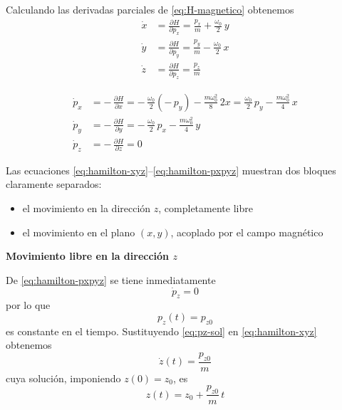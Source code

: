 \documentclass{article}
\begin{document}
Calculando las derivadas parciales de \eqref{eq:H-magnetico} obtenemos
\begin{equation}
\begin{split}
\dot{x}
&= \frac{\partial H}{\partial p_{x}}
 = \frac{p_{x}}{m} + \frac{\omega_{0}}{2}\,y \\[6pt]
\dot{y}
&= \frac{\partial H}{\partial p_{y}}
 = \frac{p_{y}}{m} - \frac{\omega_{0}}{2}\,x \\[6pt]
\dot{z}
&= \frac{\partial H}{\partial p_{z}}
 = \frac{p_{z}}{m}
\end{split}
\label{eq:hamilton-xyz}
\end{equation}

\begin{equation}
\begin{split}
\dot{p}_{x}
&= -\,\frac{\partial H}{\partial x}
 = -\,\frac{\omega_{0}}{2}\left(-\,p_{y}\right)
   - \frac{m\omega_{0}^{2}}{8}\,2x
 = \frac{\omega_{0}}{2}\,p_{y}
   - \frac{m\omega_{0}^{2}}{4}\,x \\[6pt]
\dot{p}_{y}
&= -\,\frac{\partial H}{\partial y}
 = -\,\frac{\omega_{0}}{2}\,p_{x}
   - \frac{m\omega_{0}^{2}}{4}\,y \\[6pt]
\dot{p}_{z}
&= -\,\frac{\partial H}{\partial z}
 = 0
\end{split}
\label{eq:hamilton-pxpyz}
\end{equation}

Las ecuaciones \eqref{eq:hamilton-xyz}–\eqref{eq:hamilton-pxpyz} muestran dos
bloques claramente separados:

\begin{itemize}
  \item[$\bullet$] el movimiento en la dirección $z$, completamente libre
  \item[$\bullet$] el movimiento en el plano $(x,y)$, acoplado por el campo magnético
\end{itemize}

\textcolor{trueblue}{\textbf{Movimiento libre en la dirección $z$}}

De \eqref{eq:hamilton-pxpyz} se tiene inmediatamente
\begin{equation}
\dot{p}_{z} = 0
\label{eq:pz-constante}
\end{equation}
por lo que
\begin{equation}
p_{z}(t) = p_{z0}
\label{eq:pz-sol}
\end{equation}
es constante en el tiempo. Sustituyendo \eqref{eq:pz-sol} en
\eqref{eq:hamilton-xyz} obtenemos
\begin{equation}
\dot{z}(t) = \frac{p_{z0}}{m}
\label{eq:edo-z}
\end{equation}
cuya solución, imponiendo $z(0)=z_{0}$, es
\begin{equation}
z(t) = z_{0} + \frac{p_{z0}}{m}\,t
\label{eq:z-sol}
\end{equation}
\end{document}
